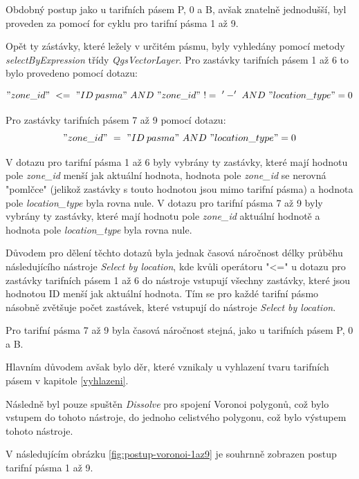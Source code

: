 Obdobný postup jako u tarifních pásem P, 0 a B, avšak znatelně jednodušší, byl proveden za pomocí
for cyklu pro tarifní pásma 1 až 9. 

Opět ty zástávky, které ležely v určitém pásmu, byly vyhledány pomocí metody \textit{selectByExpression} třídy 
\textit{QgsVectorLayer}. Pro zastávky tarifních pásem 1 až 6 to bylo provedeno pomocí dotazu:

\["zone\_id"\ <=\ "ID\: pasma"\ AND\ "zone\_id"\ !=\ '-'\ AND\ "location\_type" = 0\]  

Pro zastávky tarifních pásem 7 až 9 pomocí dotazu:
\["zone\_id"\ =\ "ID\: pasma"\ AND\ "location\_type" = 0\] 

V dotazu pro tarifní pásma 1 až 6 byly vybrány ty zastávky, které mají hodnotu pole \textit{zone\_id} menší jak aktuální hodnota,
hodnota pole \textit{zone\_id} se nerovná "pomlčce" (jelikož zastávky s touto hodnotou jsou mimo tarifní pásma)
a hodnota pole \textit{location\_type} byla rovna nule. V dotazu pro tarifní pásma 7 až 9 byly vybrány ty zastávky,
které mají hodnotu pole \textit{zone\_id} aktuální hodnotě a hodnota pole \textit{location\_type} byla rovna nule.

Důvodem pro dělení těchto dotazů byla jednak časová náročnost délky průběhu následujícího nástroje \textit{Select by location}, 
kde kvůli operátoru "<=" u dotazu pro zastávky tarifních pásem 1 až 6 do nástroje vstupují všechny zastávky, 
které jsou hodnotou ID menší jak aktuální hodnota. Tím se pro každé tarifní pásmo násobně zvětšuje počet zastávek,
které vstupují do nástroje \textit{Select by location}.

Pro tarifní pásma 7 až 9 byla časová náročnost stejná, jako u tarifních pásem P, 0 a B.

Hlavním důvodem avšak bylo  děr, které vznikaly u vyhlazení tvaru tarifních pásem v kapitole \ref{vyhlazeni}.  

Následně byl pouze spuštěn \textit{Dissolve} pro spojení Voronoi polygonů, což bylo vstupem do tohoto nástroje,
do jednoho celistvého polygonu, což bylo výstupem tohoto nástroje.

V následujícím obrázku \ref{fig:postup-voronoi-1az9} je souhrnně zobrazen postup tarifní pásma 1 až 9.

